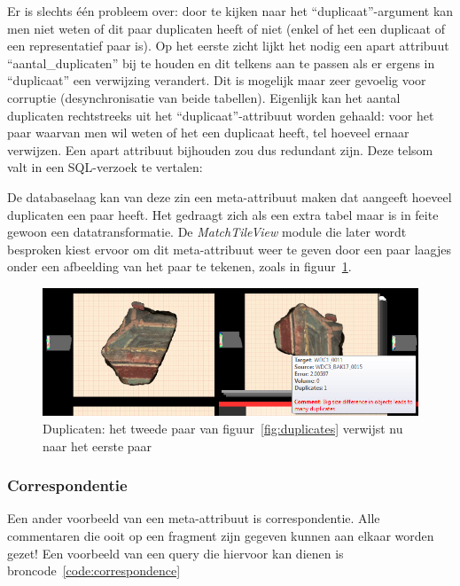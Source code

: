 Er is slechts \'e\'en probleem over: door te kijken naar het ``duplicaat''-argument kan men niet weten of dit paar duplicaten heeft of niet (enkel of het een duplicaat of een representatief paar is). Op het eerste zicht lijkt het nodig een apart attribuut ``aantal\_duplicaten'' bij te houden en dit telkens aan te passen als er ergens in ``duplicaat'' een verwijzing verandert. Dit is mogelijk maar zeer gevoelig voor corruptie (desynchronisatie van beide tabellen). Eigenlijk kan het aantal duplicaten rechtstreeks uit het ``duplicaat''-attribuut worden gehaald: voor het paar waarvan men wil weten of het een duplicaat heeft, tel hoeveel ernaar verwijzen. Een apart attribuut bijhouden zou dus redundant zijn. Deze telsom valt in een SQL-verzoek te vertalen:



De databaselaag kan van deze zin een meta-attribuut maken dat aangeeft hoeveel duplicaten een paar heeft. Het gedraagt zich als een extra tabel maar is in feite gewoon een datatransformatie. De \emph{MatchTileView} module die later wordt besproken kiest ervoor om dit meta-attribuut weer te geven door een paar laagjes onder een afbeelding van het paar te tekenen, zoals in figuur~\ref{fig:duplicatesdone}.

\begin{figure}[!h]
	\begin{center}
		\includegraphics[width=1.0\columnwidth]{images/duplicates-2.png}
		\caption{Duplicaten: het tweede paar van figuur~\ref{fig:duplicates} verwijst nu naar het eerste paar}
		\label{fig:duplicatesdone}
	\end{center}
\end{figure}

\subsubsection{Correspondentie}
Een ander voorbeeld van een meta-attribuut is correspondentie. Alle commentaren die ooit op een fragment zijn gegeven kunnen aan elkaar worden gezet! Een voorbeeld van een query die hiervoor kan dienen is broncode~\ref{code:correspondence}\\

